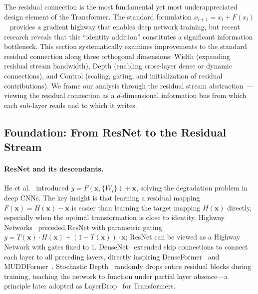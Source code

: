 \label{sec:residual_connection}

The residual connection is the most fundamental yet most underappreciated design element of the Transformer. The standard formulation $x_{l+1} = x_l + F(x_l)$~\cite{he2016deep} provides a gradient highway that enables deep network training, but recent research reveals that this ``identity addition'' constitutes a significant information bottleneck. This section systematically examines improvements to the standard residual connection along three orthogonal dimensions: Width (expanding residual stream bandwidth), Depth (enabling cross-layer dense or dynamic connections), and Control (scaling, gating, and initialization of residual contributions). We frame our analysis through the residual stream abstraction~\cite{elhage2021mathematical}---viewing the residual connection as a $d$-dimensional information bus from which each sub-layer reads and to which it writes.

\subsection{Foundation: From ResNet to the Residual Stream}
\label{subsec:residual_foundation}

\paragraph{ResNet and its descendants.}
He et al.~\cite{he2016deep} introduced $y = F(\mathbf{x}, \{W_i\}) + \mathbf{x}$, solving the degradation problem in deep CNNs. The key insight is that learning a residual mapping $F(\mathbf{x}) = H(\mathbf{x}) - \mathbf{x}$ is easier than learning the target mapping $H(\mathbf{x})$ directly, especially when the optimal transformation is close to identity. Highway Networks~\cite{srivastava2015highway} preceded ResNet with parametric gating $y = T(\mathbf{x}) \cdot H(\mathbf{x}) + (1-T(\mathbf{x})) \cdot \mathbf{x}$; ResNet can be viewed as a Highway Network with gates fixed to 1. DenseNet~\cite{huang2017densely} extended skip connections to connect each layer to all preceding layers, directly inspiring DenseFormer~\cite{pagliardini2024denseformer} and MUDDFormer~\cite{xiao2025muddformer}. Stochastic Depth~\cite{huang2016deep} randomly drops entire residual blocks during training, teaching the network to function under partial layer absence---a principle later adopted as LayerDrop~\cite{fan2020reducing} for Transformers.

